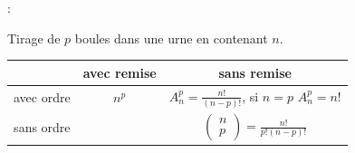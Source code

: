 \documentclass{book}
\begin{document}
 :

Tirage de $p$ boules dans une urne en contenant $n$.\\
\begin{tabular}{c|c|c}
 & avec remise  & sans remise\\ \hline
 avec ordre &  $n^p$ &  $A^p_n=\frac{n!}{(n-p)!}$, si $n=p$ $A_n^p=n!$\\  \hline
 sans ordre &        & $\begin{pmatrix}n\\p\end{pmatrix} =\frac{n!}{p!(n-p)!}$
\end{tabular}
\end{document}
